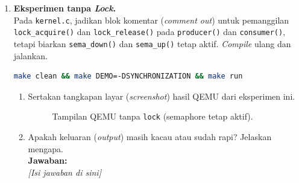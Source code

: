 \begin{enumerate}

	\item \textbf{Eksperimen tanpa \textit{Lock}.}\\
	      Pada \texttt{kernel.c}, jadikan blok komentar (\textit{comment out}) untuk pemanggilan \texttt{lock\_acquire()} dan \texttt{lock\_release()} pada \texttt{producer()} dan \texttt{consumer()}, tetapi biarkan \texttt{sema\_down()} dan \texttt{sema\_up()} tetap aktif. \textit{Compile} ulang dan jalankan.

	      \begin{lstlisting}[language=bash, caption={Kompilasi untuk eksperimen tanpa \textit{lock}}]
make clean && make DEMO=-DSYNCHRONIZATION && make run
    \end{lstlisting}

	      \begin{enumerate}
		      \item Sertakan tangkapan layar (\textit{screenshot}) hasil QEMU dari eksperimen ini.


		            \begin{figure}[H]
			            \centering
			            \caption{Tampilan QEMU tanpa \texttt{lock} (semaphore tetap aktif).}
		            \end{figure}

		      \item Apakah keluaran (\textit{output}) masih kacau atau sudah rapi? Jelaskan mengapa.\\[0.2cm]
		            \textbf{Jawaban:}\\
		            \textit{[Isi jawaban di sini]}
	      \end{enumerate}


\end{enumerate}
